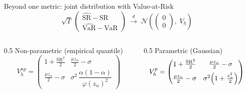 \documentclass[aspectratio=169,10pt]{beamer}
\begin{document}
\begin{frame}{Beyond one metric: joint distribution with Value-at-Risk}
  \[ \sqrt{T}\,
   \begin{pmatrix} \widehat{\mathrm{SR}}-\mathrm{SR} \\[3pt]
                   \widehat{\mathrm{VaR}}-\mathrm{VaR} \end{pmatrix}
   \;\xrightarrow{\,d\,}\;
   \mathcal{N}\!\left(\begin{pmatrix} 0 \\[3pt] 0 \end{pmatrix},\; V_{h}\right) \]

  \vspace{0.3em}
  \begin{columns}[c]
    \begin{column}{0.5\textwidth}\centering
      {\footnotesize Non-parametric (empirical quantile)}
      \[ V^{np}_{h} = \begin{pmatrix}
         1+\tfrac{\mathrm{SR}^2}{2} & \tfrac{\mu z_\alpha}{2}-\sigma \\[6pt]
         \tfrac{\mu z_\alpha}{2}-\sigma & \sigma^2\,\dfrac{\alpha(1-\alpha)}{\varphi(z_\alpha)^2}
         \end{pmatrix} \]
    \end{column}
    \begin{column}{0.5\textwidth}\centering
      {\footnotesize Parametric (Gaussian)}
      \[ V^{p}_{h} = \begin{pmatrix}
         1+\tfrac{\mathrm{SR}^2}{2} & \tfrac{\mu z_\alpha}{2}-\sigma \\[6pt]
         \tfrac{\mu z_\alpha}{2}-\sigma & \sigma^2\Bigl(1+\tfrac{z_\alpha^2}{2}\Bigr)
         \end{pmatrix} \]
    \end{column}
  \end{columns}


\end{frame}
\end{document}
